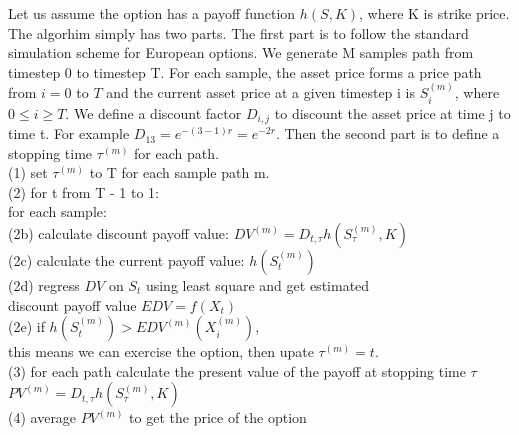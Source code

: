 \documentclass[a4paper]{article}
\begin{document}
Let us assume the option has a payoff function $h(S, K)$, where K is strike price.
The algorhim simply has two parts. The first part is to follow the standard simulation scheme for European options. We generate M samples path from timestep 0 to timestep T. For each sample, the asset price forms a price path from $i = 0$ to $T$ and the current asset price at a given timestep i is $S^{(m)}_i$, where $0 \leq i \geq T$. We define a discount factor $D_{i,j}$ to discount the asset price at time j to time t. For example $D_{13} = e^{-(3-1)r} = e^{-2r}$. 
Then the second part is to define a stopping time $\tau^{(m)}$ for each path. \\
(1) set $\tau^{(m)}$ to T for each sample path m.\\
(2) for t from T - 1 to 1:\\
\indent  for each sample:\\
\indent  \indent(2b) calculate discount payoff value: $DV^{(m)} = D_{t, \tau} h(S^{(m)}_\tau, K) $\\
\indent  \indent(2c) calculate the current payoff value: $h(S^{(m)}_t)$\\
\indent	 \indent(2d) regress $DV$ on ${S_t}$ using least square and get estimated \\
\indent  \indent    discount payoff value $EDV = f(X_t)$\\
\indent	 \indent(2e) if $h(S^{(m)}_t) > EDV^{(m)}(X^{(m)}_i)$, \\
\indent  \indent     this means we can exercise the option, then upate $\tau^{(m)} = t$.\\
(3) for each path calculate the present value of the payoff at stopping time $\tau$ \\
$PV^{(m)} = D_{t, \tau} h(S^{(m)}_\tau, K)$\\
(4) average $PV^{(m)}$ to get the price of the option\\
\end{document}
